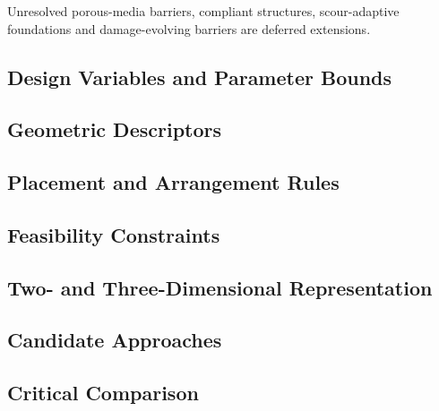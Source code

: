 Unresolved porous-media barriers, compliant structures, scour-adaptive
foundations and damage-evolving barriers are deferred extensions.

\subsection{Design Variables and Parameter Bounds}
\label{sec:res-geo-tax-design-variables-parameter-bounds}


\subsection{Geometric Descriptors}
\label{sec:res-geo-tax-geometric-descriptors}


\subsection{Placement and Arrangement Rules}
\label{sec:res-geo-tax-placement-arrangement-rules}


\subsection{Feasibility Constraints}
\label{sec:res-geo-tax-feasibility-constraints}


\subsection{Two- and Three-Dimensional Representation}
\label{sec:res-geo-tax-two-three-dimensional-representation}


\subsection{Candidate Approaches}
\label{sec:res-geo-tax-candidate-approaches}


\subsection{Critical Comparison}
\label{sec:res-geo-tax-critical-comparison}

